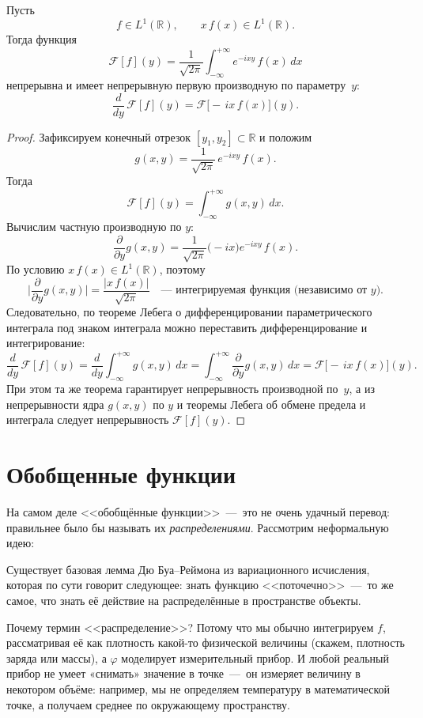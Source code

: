 \begin{theorem}
Пусть
\[
f\in L^1(\mathbb R),
\qquad
x\,f(x)\in L^1(\mathbb R).
\]
Тогда функция
\[
\mathcal F[f](y)
=\frac1{\sqrt{2\pi}}\int_{-\infty}^{+\infty}e^{-i x y}\,f(x)\,dx
\]
непрерывна и имеет непрерывную первую производную по параметру~$y$:
\[
\frac{d}{dy}\,\mathcal F[f](y)
=\mathcal F\bigl[-\,i x\,f(x)\bigr](y).
\]
\end{theorem}

\begin{proof}
Зафиксируем конечный отрезок $[y_1,y_2]\subset\mathbb R$ и положим
\[
g(x,y)
=\frac1{\sqrt{2\pi}}\,e^{-i x y}\,f(x).
\]
Тогда
\[
\mathcal F[f](y)=\int_{-\infty}^{+\infty}g(x,y)\,dx.
\]
Вычислим частную производную по $y$:
\[
\frac{\partial}{\partial y}g(x,y)
=\frac1{\sqrt{2\pi}}\bigl(-i x\bigr)e^{-i x y}\,f(x).
\]
По условию $x\,f(x)\in L^1(\mathbb R)$, поэтому
\[
\biggl|\frac{\partial}{\partial y}g(x,y)\biggr|
=\frac{|x\,f(x)|}{\sqrt{2\pi}}
\quad\text{— интегрируемая функция (независимо от $y$).}
\]
Следовательно, по теореме Лебега о дифференцировании параметрического
интеграла под знаком интеграла можно переставить дифференцирование и
интегрирование:
\[
\frac{d}{dy}\,\mathcal F[f](y)
=\frac{d}{dy}\int_{-\infty}^{+\infty}g(x,y)\,dx
=\int_{-\infty}^{+\infty}\frac{\partial}{\partial y}g(x,y)\,dx
=\mathcal F\bigl[-\,i x\,f(x)\bigr](y).
\]
При этом та же теорема гарантирует непрерывность производной по~$y$,
а из непрерывности ядра $g(x,y)$ по $y$ и теоремы Лебега об обмене
предела и интеграла следует непрерывность $\mathcal F[f](y)$.
\end{proof}

\newpage
\section{Обобщенные функции}
На самом деле <<обобщённые функции>>~---~это не очень удачный перевод: правильнее было бы называть их \emph{распределениями}. Рассмотрим неформальную идею:

Существует базовая лемма Дю Буа--Реймона из вариационного исчисления, которая по сути говорит следующее: знать функцию <<поточечно>>~---~то же самое, что знать её действие на распределённые в пространстве объекты.

Почему термин <<распределение>>? Потому что мы обычно интегрируем \(f\), рассматривая её как плотность какой-то физической величины (скажем, плотность заряда или массы), а \(\varphi\) моделирует измерительный прибор. И любой реальный прибор не умеет «снимать» значение в точке~---~он измеряет величину в некотором объёме: например, мы не определяем температуру в математической точке, а получаем среднее по окружающему пространству.

